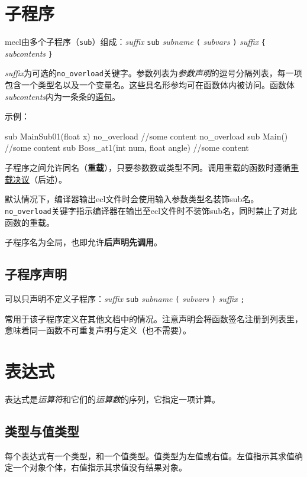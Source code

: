 \documentclass[UTF8]{ctexart}
\begin{document}
\section{子程序}

mecl由多个子程序（\verb|sub|）组成：\textit{suffix} \verb|sub| \textit{subname} \verb|(| \textit{subvars} \verb|)| \textit{suffix} \verb|{| \textit{subcontents} \verb|}|

\textit{suffix}为可选的\verb|no_overload|关键字。参数列表为\textit{参数声明}的逗号分隔列表，每一项包含一个类型名以及一个变量名。这些具名形参均可在函数体内被访问。函数体\textit{subcontents}内为一条条的\hyperref[yuju]{语句}。

示例：

\begin{MUAvbt}
sub MainSub01(float x) no_overload
{
	//some content
}
no_overload sub Main()
{
	//some content
}
sub Boss_at1(int num, float angle) {
	//some content
}
\end{MUAvbt}

子程序之间允许同名（\textbf{重载}），只要参数数或类型不同。调用重载的函数时遵循\hyperref[chongzai]{重载决议}（后述）。

默认情况下，编译器输出ecl文件时会使用输入参数类型名装饰sub名。\verb|no_overload|关键字指示编译器在输出至ecl文件时不装饰sub名，同时禁止了对此函数的重载。

子程序名为全局，也即允许\textbf{后声明先调用}。

\subsection{子程序声明}

可以只声明不定义子程序：\textit{suffix} \verb|sub| \textit{subname} \verb|(| \textit{subvars} \verb|)| \textit{suffix} \verb|;|

常用于该子程序定义在其他文档中的情况。注意声明会将函数签名注册到列表里，意味着同一函数不可重复声明与定义（也不需要）。

\section{表达式}

表达式是\textit{运算符}和它们的\textit{运算数}的序列，它指定一项计算。

\subsection{类型与值类型}

每个表达式有一个类型，和一个值类型。值类型为左值或右值。左值指示其求值确定一个对象个体，右值指示其求值没有结果对象。
\end{document}

